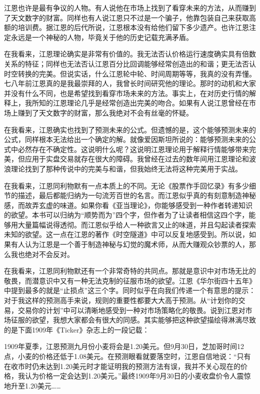 江恩也许是最有争议的人物。有人说他在市场上找到了看穿未来的方法，从而赚到了天文数字的财富。同样也有人说江恩只不过是一个骗子，他靠包装自己来获取高额的培训费。据江恩的后代所说，江恩根本没有给他们留下多少遗产。也许江恩注定永远是一个神秘的人物，毕竟关于他的历史记载充满矛盾。

在我看来，江恩理论确实是非常有价值的。我无法否认价格运行速度确实具有倍数关系的特征；同样也无法否认江恩百分比回调能够经常创造出的和谐；更无法否认时空转换的完美。但说实话，什么江恩轮中轮、时间周期等等，我真的没有弄懂。七八年前江恩真的是我最崇拜的人，我曾长时间研究他的理论。那时的动机和大家并没有什么不同，也是希望找到看穿市场未来的方法。事实上，在对历史行情的解释上，我所知的江恩理论几乎是经常创造出完美的吻合。如果有人说江恩曾经在市场上赚到了天文数字的财富，那么我绝对不会有丝毫的怀疑。

在我看来，江恩确实也找到了预测未来的公式。但遗憾的是，这个能够预测未来的公式，同样根本无法给出一个确定的解。就像爱因斯坦所说的：能够预测未来的公式中必然存在不确定性。这说明什么呢？这说明江恩理论用于解释行情能够带来完美，但应用于实盘交易就存在很大的障碍。我曾经在过去的数年间用江恩理论和波浪理论找到了那种传说中的完美与和谐，但我始终无法将这种完美用于实战。

在我看来，江恩同利物默有一点本质上的不同。无论《股票作手回忆录》有多少细节的描述，最后都能归纳为一句流芳百世的名言。而江恩似乎真的有刻意制造神秘感，而故弄玄虚的味道。如果你看《亚当理论》，你能够感受到一种作者转递知识的欲望。本书可以归纳为“顺势而为”四个字，但作者为了让读者相信这四个字，能够用大量篇幅说得透彻。而江恩似乎给人一种欲言又止的味道，并且勾起读者探索未知的欲望。这一点在江恩的著作《时空隧道》中可以反复地感受到。所以说，如果有人认为江恩是一个善于制造神秘与幻觉的魔术师，从而大赚观众钞票的人，那么我也绝对不会反对。

在我看来，江恩同利物默还有一个非常奇特的共同点。那就是意识中对市场无比的敬畏，而潜意识中又有一种无法克制的征服市场的欲望。江恩《华尔街四十五年》中提到最多的就是“止损点”这三个字。同时似乎在向我们传递一个有意思的提示：对于我这样的预测高手来说，规则的重要性都要大大高于预测。从“计划你的交易，交易你的计划”中可以清晰地感受到一种对市场策略化的敬畏。说到江恩对市场征服的欲望，我想大家都会有很大的同感。其实能够把这种欲望描绘得淋漓尽致的是下面1909年《Ticker》杂志上的一段记载：

{\kaishu
1909年夏季，江恩预测九月份小麦将会是1.20美元。但9月30日，芝加哥时间12点，小麦的价格还低于1.08美元。在预测眼看就要落空时，江恩自信地说：“只有在收市时仍未达到1.20美元时才能证明我的预测方法有误，我并不关心现在的价格，我认为价格一定会达到1.20美元。”最终1909年9月30日的小麦收盘价令人震惊地升至1.20美元……
}

